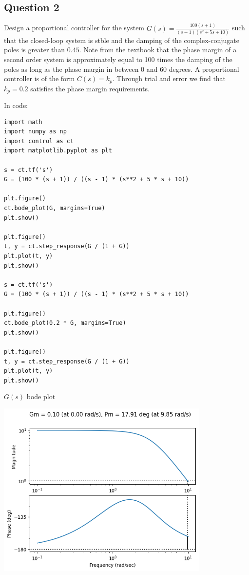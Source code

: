 \documentclass[11pt]{article}
\begin{document}
\subsection{Question 2}

Design a proportional controller for the system $G(s) = \frac{100(s + 1)}{(s - 1)(s^2 + 5s + 10)}$ such that the closed-loop system is stble and the damping of the complex-conjugate poles is greater than $0.45$. Note from the textbook that the phase margin of a second order system is approximately equal to 100 times the damping of the poles as long as the phase margin in between 0 and 60 degrees. A proportional controller is of the form $C(s) = k_p$. Through trial and error we find that $k_p = 0.2$ satisfies the phase margin requirements.

In code:

\begin{verbatim}
import math
import numpy as np
import control as ct
import matplotlib.pyplot as plt

s = ct.tf('s')
G = (100 * (s + 1)) / ((s - 1) * (s**2 + 5 * s + 10))

plt.figure()
ct.bode_plot(G, margins=True)
plt.show()

plt.figure()
t, y = ct.step_response(G / (1 + G))
plt.plot(t, y)
plt.show()

s = ct.tf('s')
G = (100 * (s + 1)) / ((s - 1) * (s**2 + 5 * s + 10))

plt.figure()
ct.bode_plot(0.2 * G, margins=True)
plt.show()

plt.figure()
t, y = ct.step_response(G / (1 + G))
plt.plot(t, y)
plt.show()
\end{verbatim}

$G(s)$ bode plot

\includegraphics[width=300pt]{a5_5.png}
\end{document}
